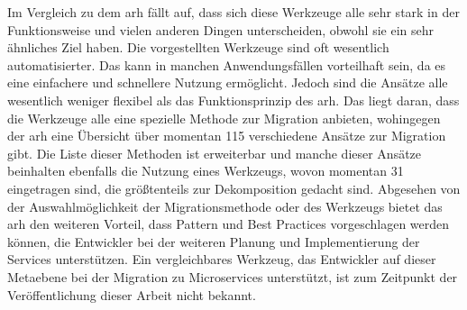 Im Vergleich zu dem \gls{arh} fällt auf, dass sich diese Werkzeuge alle sehr stark in der Funktionsweise und vielen anderen Dingen unterscheiden, obwohl sie ein sehr ähnliches Ziel haben.
Die vorgestellten Werkzeuge sind oft wesentlich automatisierter.
Das kann in manchen Anwendungsfällen vorteilhaft sein, da es eine einfachere und schnellere Nutzung ermöglicht.
Jedoch sind die Ansätze alle wesentlich weniger flexibel als das Funktionsprinzip des \gls{arh}.
Das liegt daran, dass die Werkzeuge alle eine spezielle Methode zur Migration anbieten, wohingegen der \gls{arh} eine Übersicht über momentan 115 verschiedene Ansätze zur Migration gibt.
Die Liste dieser Methoden ist erweiterbar und manche dieser Ansätze beinhalten ebenfalls die Nutzung eines Werkzeugs, wovon momentan 31 eingetragen sind, die größtenteils zur Dekomposition gedacht sind.
Abgesehen von der Auswahlmöglichkeit der Migrationsmethode oder des Werkzeugs bietet das \gls{arh} den weiteren Vorteil, dass Pattern und Best Practices vorgeschlagen werden können, die Entwickler bei der weiteren Planung und Implementierung der Services unterstützen.
Ein vergleichbares Werkzeug, das Entwickler auf dieser Metaebene bei der Migration zu Microservices unterstützt, ist zum Zeitpunkt der Veröffentlichung dieser Arbeit nicht bekannt.

